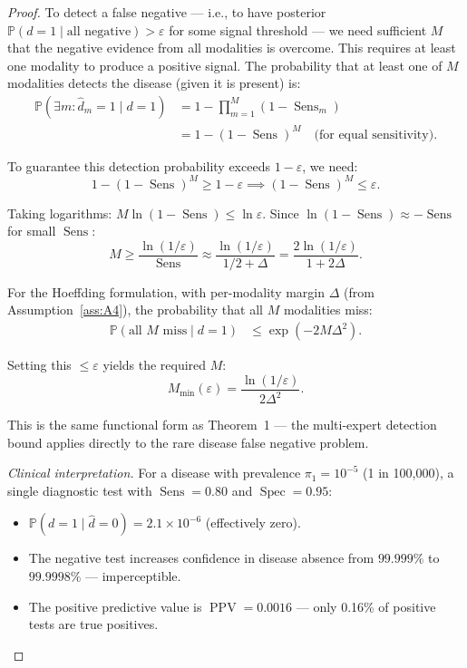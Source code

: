 \documentclass[11pt,a4paper]{article}
\theoremstyle{definition}
\DeclareMathOperator{\Sens}{Sens}
\DeclareMathOperator{\Spec}{Spec}
\DeclareMathOperator{\PPV}{PPV}
\newcommand{\Pbb}{\mathbb{P}}
\newcommand{\disease}{d}                       %
\newcommand{\diagnosis}{\hat{d}}               %
\begin{document}
\begin{proof}
To detect a false negative --- i.e., to have posterior $\Pbb(\disease=1 \mid \text{all negative}) > \varepsilon$
for some signal threshold --- we need sufficient $M$ that the negative
evidence from all modalities is overcome. This requires at least one
modality to produce a positive signal. The probability that at least one
of $M$ modalities detects the disease (given it is present) is:
\begin{align}
    \Pbb(\exists m: \diagnosis_m = 1 \mid \disease = 1)
    &= 1 - \prod_{m=1}^{M} (1 - \Sens_m) \\
    &= 1 - (1-\Sens)^M \quad \text{(for equal sensitivity)}.
\end{align}

To guarantee this detection probability exceeds $1-\varepsilon$, we need:
\begin{equation}
    1 - (1-\Sens)^M \ge 1 - \varepsilon \implies (1-\Sens)^M \le \varepsilon.
\end{equation}

Taking logarithms: $M \ln(1-\Sens) \le \ln\varepsilon$. Since
$\ln(1-\Sens) \approx -\Sens$ for small $\Sens$:
\begin{equation}
    M \ge \frac{\ln(1/\varepsilon)}{\Sens} \approx \frac{\ln(1/\varepsilon)}{1/2 + \Delta}
    = \frac{2\ln(1/\varepsilon)}{1 + 2\Delta}.
\end{equation}

For the Hoeffding formulation, with per-modality margin $\Delta$ (from
Assumption~\ref{ass:A4}), the probability that all $M$ modalities miss:
\begin{align}
    \Pbb(\text{all } M \text{ miss} \mid \disease = 1)
    &\le \exp(-2M\Delta^2).
\end{align}

Setting this $\le \varepsilon$ yields the required $M$:
\begin{equation}
    M_{\min}(\varepsilon) = \frac{\ln(1/\varepsilon)}{2\Delta^2}.
\end{equation}

This is the same functional form as Theorem~1 --- the multi-expert detection
bound applies directly to the rare disease false negative problem.

\medskip\noindent\textit{Clinical interpretation.}
For a disease with prevalence $\pi_1 = 10^{-5}$ (1 in 100,000), a single
diagnostic test with $\Sens = 0.80$ and $\Spec = 0.95$:
\begin{itemize}[nosep]
    \item $\Pbb(\disease=1 \mid \diagnosis=0) = 2.1 \times 10^{-6}$ (effectively zero).
    \item The negative test increases confidence in disease absence from
    $99.999\%$ to $99.9998\%$ --- imperceptible.
    \item The positive predictive value is $\PPV = 0.0016$ --- only 0.16\%
    of positive tests are true positives.
\end{itemize}


\end{proof}
\end{document}
